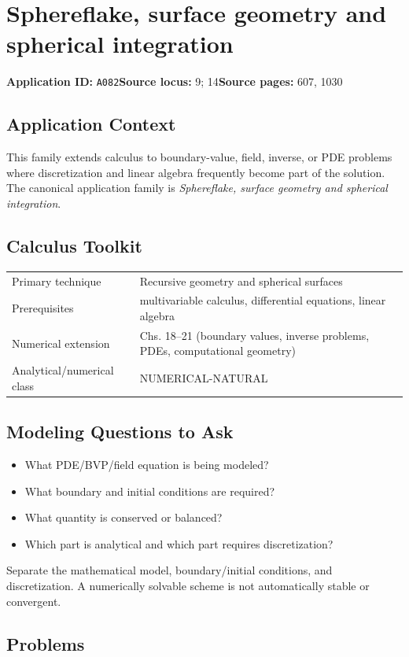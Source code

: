 \documentclass[11pt]{book}
\newcommand{\pid}[1]{\texttt{#1}}
\begin{document}
\chapter{Sphereflake, surface geometry and spherical integration}\label{app:A082}
\textbf{Application ID:} \pid{A082}\quad \textbf{Source locus:} 9; 14\quad \textbf{Source pages:} 607, 1030
\section*{Application Context}
This family extends calculus to boundary-value, field, inverse, or PDE problems where discretization and linear algebra frequently become part of the solution. The canonical application family is \emph{Sphereflake, surface geometry and spherical integration}.
\section*{Calculus Toolkit}
\begin{tabularx}{\textwidth}{@{}lX@{}}\toprule
Primary technique & Recursive geometry and spherical surfaces \\
Prerequisites & multivariable calculus, differential equations, linear algebra \\
Numerical extension & Chs. 18–21 (boundary values, inverse problems, PDEs, computational geometry) \\
Analytical/numerical class & NUMERICAL-NATURAL \\
\bottomrule\end{tabularx}
\section*{Modeling Questions to Ask}\begin{itemize}
\item What PDE/BVP/field equation is being modeled?
\item What boundary and initial conditions are required?
\item What quantity is conserved or balanced?
\item Which part is analytical and which part requires discretization?
\end{itemize}
\begin{errorbox}Separate the mathematical model, boundary/initial conditions, and discretization. A numerically solvable scheme is not automatically stable or convergent.\end{errorbox}
\section*{Problems}
\end{document}
